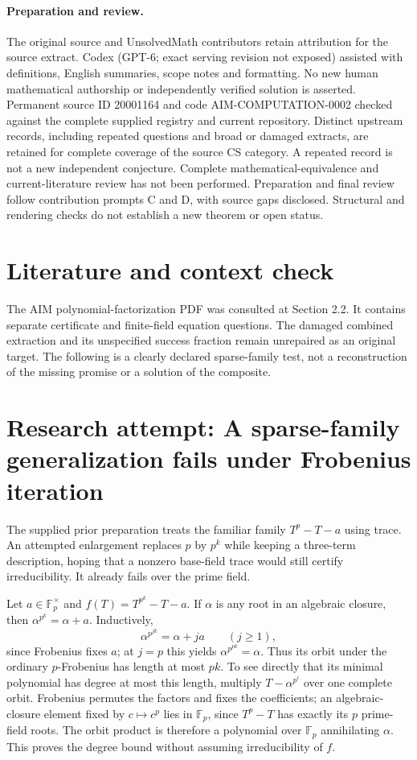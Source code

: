 \documentclass[11pt]{article}
\begin{document}
\paragraph{Preparation and review.}
The original source and UnsolvedMath contributors retain attribution for the source extract. Codex (GPT-6; exact serving revision not exposed) assisted with definitions, English summaries, scope notes and formatting. No new human mathematical authorship or independently verified solution is asserted. Permanent source ID 20001164 and code AIM-COMPUTATION-0002 checked against the complete supplied registry and current repository. Distinct upstream records, including repeated questions and broad or damaged extracts, are retained for complete coverage of the source CS category. A repeated record is not a new independent conjecture. Complete mathematical-equivalence and current-literature review has not been performed. Preparation and final review follow contribution prompts C and D, with source gaps disclosed. Structural and rendering checks do not establish a new theorem or open status.
\label{end:20001164}

\section{Literature and context check}
The AIM polynomial-factorization PDF was consulted at Section 2.2. It
contains separate certificate and finite-field equation questions. The damaged
combined extraction and its unspecified success fraction remain unrepaired as
an original target. The following is a clearly declared sparse-family test,
not a reconstruction of the missing promise or a solution of the composite.
\section{Research attempt: A sparse-family generalization fails under Frobenius iteration}
The supplied prior preparation treats the familiar family $T^p-T-a$ using
trace. An attempted enlargement replaces $p$ by $p^k$ while keeping a three-term
description, hoping that a nonzero base-field trace would still certify
irreducibility. It already fails over the prime field.

Let $a\in\mathbb F_p^\times$ and $f(T)=T^{p^k}-T-a$. If $\alpha$ is any root
in an algebraic closure, then
$\alpha^{p^k}=\alpha+a$. Inductively,
\[
 \alpha^{p^{jk}}=\alpha+ja\qquad(j\ge1),
\]
since Frobenius fixes $a$; at $j=p$ this yields
$\alpha^{p^{pk}}=\alpha$. Thus its orbit under the ordinary $p$-Frobenius
has length at most $pk$. To see directly that its minimal polynomial has degree
at most this length, multiply $T-\alpha^{p^i}$ over one complete orbit. Frobenius
permutes the factors and fixes the coefficients; an algebraic-closure element
fixed by $c\mapsto c^p$ lies in $\mathbb F_p$, since $T^p-T$ has exactly its
$p$ prime-field roots. The orbit product is therefore a polynomial over
$\mathbb F_p$ annihilating $\alpha$. This proves the degree bound without
assuming irreducibility of $f$.
\end{document}
